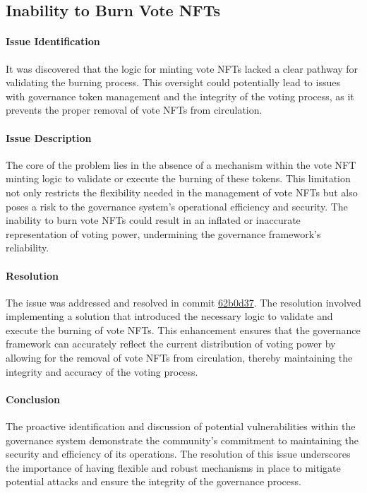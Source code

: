 \documentclass[11pt]{article}
\begin{document}
\subsection{Inability to Burn Vote NFTs}

\paragraph{Issue Identification}
It was discovered that the logic for minting vote NFTs lacked a clear pathway for validating the burning process.
This oversight could potentially lead to issues with governance token management and the integrity of the voting process, as it prevents the proper removal of vote NFTs from circulation.

\paragraph{Issue Description}
The core of the problem lies in the absence of a mechanism within the vote NFT minting logic to validate or execute the burning of these tokens.
This limitation not only restricts the flexibility needed in the management of vote NFTs but also poses a risk to the governance system's operational efficiency and security.
The inability to burn vote NFTs could result in an inflated or inaccurate representation of voting power, undermining the governance framework's reliability.

\paragraph{Resolution}
The issue was addressed and resolved in commit \href{https://github.com/MuesliSwapTeam/muesliswap-atala-onchain-governance/commit/62b0d370f1daf889cce1cc18385a5cabd009b397}{62b0d37}.
The resolution involved implementing a solution that introduced the necessary logic to validate and execute the burning of vote NFTs. This enhancement ensures that the governance framework can accurately reflect the current distribution of voting power by allowing for the removal of vote NFTs from circulation, thereby maintaining the integrity and accuracy of the voting process.


\paragraph{Conclusion}
The proactive identification and discussion of potential vulnerabilities within the governance system demonstrate the community's commitment to maintaining the security and efficiency of its operations. The resolution of this issue underscores the importance of having flexible and robust mechanisms in place to mitigate potential attacks and ensure the integrity of the governance process.
\end{document}
